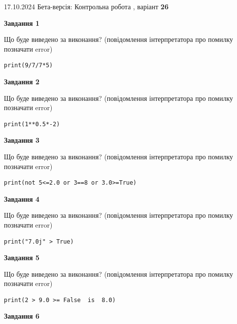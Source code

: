 \documentclass[12pt, ukrainian]{article}
\begin{document}
{\Large{17.10.2024 Бета-версія: Контрольна робота , варіант  \No \textbf { 26 }\par}}
{
\begin {large}
{\begin {center}\textbf{Завдання 1}\end {center}}

Що буде виведено за виконання? (повідомлення інтерпретатора про помилку позначати error)\par
\begin{verbatim}
print(9/7/7*5)
\end{verbatim}

{\begin {center}\textbf{Завдання 2}\end {center}}

Що буде виведено за виконання? (повідомлення інтерпретатора про помилку позначати error)\par
\begin{verbatim}
print(1**0.5*-2)
\end{verbatim}

{\begin {center}\textbf{Завдання 3}\end {center}}

Що буде виведено за виконання? (повідомлення інтерпретатора про помилку позначати error)\par
\begin{verbatim}
print(not 5<=2.0 or 3==8 or 3.0>=True)
\end{verbatim}

{\begin {center}\textbf{Завдання 4}\end {center}}

Що буде виведено за виконання? (повідомлення інтерпретатора про помилку позначати error)\par
\begin{verbatim}
print("7.0j" > True)
\end{verbatim}

{\begin {center}\textbf{Завдання 5}\end {center}}

Що буде виведено за виконання? (повідомлення інтерпретатора про помилку позначати error)\par
\begin{verbatim}
print(2 > 9.0 >= False  is  8.0)
\end{verbatim}

{\begin {center}\textbf{Завдання 6}\end {center}}


\end{large}}
\end{document}
